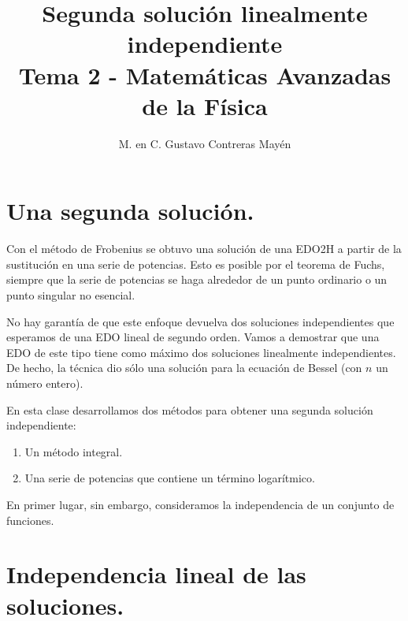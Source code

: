 
\title{Segunda solución linealmente independiente \\ \large {Tema 2 - Matemáticas Avanzadas de la Física}\vspace{-3ex}}

\author{M. en C. Gustavo Contreras Mayén}
\date{ }

\pagestyle{fancy}
\fancyhf{}
\lhead{\leftmark}
\rfoot{\thepage}
\setlength{\headheight}{16pt}%



\maketitle
\fontsize{14}{14}\selectfont

\section{Una segunda solución.}

Con el método de Frobenius se obtuvo una solución de una EDO2H a partir de la sustitución en una serie de potencias. Esto es posible por el teorema de Fuchs, siempre que la serie de potencias se haga alrededor de un punto ordinario o un punto singular no esencial.
\par
No hay garantía de que este enfoque devuelva dos soluciones independientes que esperamos de una EDO lineal de segundo orden. Vamos a demostrar que una EDO de este tipo tiene como máximo dos soluciones linealmente independientes. De hecho, la técnica dio sólo una solución para la ecuación de Bessel (con $n$ un número entero).
\par
En esta clase desarrollamos dos métodos para obtener una segunda solución independiente:
\begin{enumerate}
\item Un método integral.
\item Una serie de potencias que contiene un término logarítmico.
\end{enumerate}
En primer lugar, sin embargo, consideramos la independencia de un conjunto de funciones.

\section{Independencia lineal de las soluciones.}

